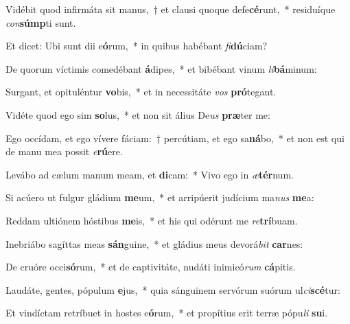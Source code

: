 \item Vidébit quod infirmáta sit manus,~† et clausi quoque defe\textbf{cé}runt,~* residuíque \textit{con}\textbf{súmp}ti sunt.
\item Et dicet: Ubi sunt dii e\textbf{ó}rum,~* in quibus habébant \textit{fi}\textbf{dú}ciam?
\item De quorum víctimis comedébant \textbf{á}dipes,~* et bibébant vinum \textit{li}\textbf{bá}minum:
\item Surgant, et opituléntur \textbf{vo}bis,~* et in necessitáte \textit{vos} \textbf{pró}tegant.
\item Vidéte quod ego sim \textbf{so}lus,~* et non sit álius De\textit{us} \textbf{præ}ter me:
\item Ego occídam, et ego vívere fáciam:~† percútiam, et ego sa\textbf{ná}bo,~* et non est qui de manu mea possit \textit{e}\textbf{rú}ere.
\item Levábo ad cælum manum meam, et \textbf{di}cam:~* Vivo ego in \textit{æ}\textbf{tér}num.
\item Si acúero ut fulgur gládium \textbf{me}um,~* et arripúerit judícium ma\textit{nus} \textbf{me}a:
\item Reddam ultiónem hóstibus \textbf{me}is,~* et his qui odérunt me \textit{re}\textbf{trí}buam.
\item Inebriábo sagíttas meas \textbf{sán}guine,~* et gládius meus devorá\textit{bit} \textbf{car}nes:
\item De cruóre occi\textbf{só}rum,~* et de captivitáte, nudáti inimicó\textit{rum} \textbf{cá}pitis.
\item Laudáte, gentes, pópulum \textbf{e}jus,~* quia sánguinem servórum suórum ul\textit{ci}\textbf{scé}tur:
\item Et vindíctam retríbuet in hostes e\textbf{ó}rum,~* et propítius erit terræ pópu\textit{li} \textbf{su}i.
